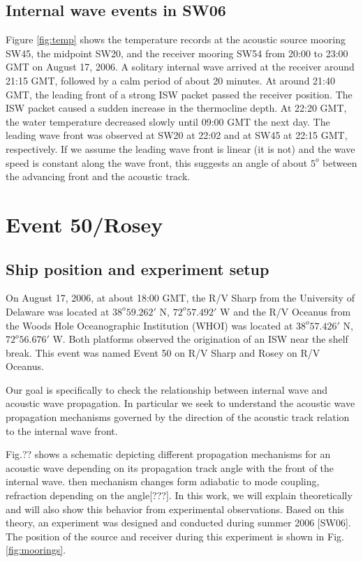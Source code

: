 \subsection{Internal wave events in SW06}

Figure \ref{fig:temp} shows the temperature records at the acoustic
source mooring SW45, the midpoint SW20, and the receiver mooring
SW54 from 20:00 to 23:00 GMT on August 17, 2006. A solitary internal wave arrived at the receiver around 21:15 GMT, followed by a calm
period of about 20 minutes. At around 21:40 GMT, the leading front
of a strong ISW packet passed the receiver position. The ISW packet
caused a sudden increase in the thermocline depth. At 22:20 GMT, the
water temperature decreased slowly until 09:00 GMT the next day. The
leading wave front was observed at SW20 at 22:02 and at SW45 at
22:15 GMT, respectively. If we assume the leading wave front is
linear (it is not) and the wave speed is constant along the wave
front, this suggests an angle of about $5^o$ between the advancing
front and the acoustic track.

\section{Event 50/Rosey}
\subsection{Ship position and experiment setup}
On August 17, 2006, at about 18:00 GMT, the R/V Sharp from the
University of Delaware was located at $38^o59.262'$ N, $72^o57.492'$ W and
the R/V Oceanus from the Woods Hole Oceanographic Institution (WHOI)
was located at $38^o57.426'$ N, $72^o56.676'$ W. Both platforms observed
the origination of an ISW near the shelf break. This event was named
Event 50 on R/V Sharp and Rosey on R/V Oceanus.

Our goal is specifically to check the relationship between internal wave and acoustic wave propagation. In particular we seek to understand the acoustic wave propagation mechanisms governed by the direction of the acoustic track relation to the internal wave front. 



Fig.?? shows a schematic depicting different propagation mechanisms for an acoustic wave depending on its propagation track angle with the front of the internal wave. then mechanism changes form adiabatic to mode coupling, refraction depending on the angle[???]. In this work, we will explain theoretically and will also show this behavior from experimental observations. Based on this theory, an experiment was designed and conducted during summer 2006 [SW06]. The position of the source and receiver during this experiment is shown in Fig.\ref{fig:moorings}.


